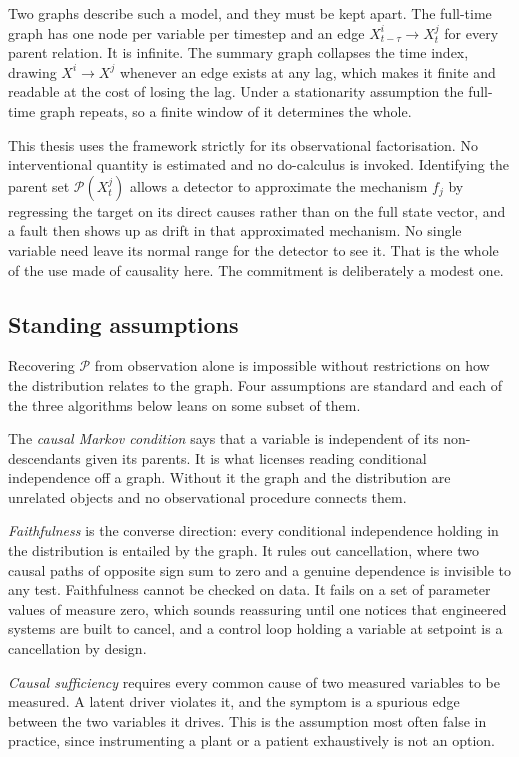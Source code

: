 Two graphs describe such a model, and they must be kept apart. The full-time graph has one node per variable per timestep and an edge $X^i_{t-\tau} \to X^j_t$ for every parent relation. It is infinite. The summary graph collapses the time index, drawing $X^i \to X^j$ whenever an edge exists at any lag, which makes it finite and readable at the cost of losing the lag. Under a stationarity assumption the full-time graph repeats, so a finite window of it determines the whole.

This thesis uses the framework strictly for its observational factorisation. No interventional quantity is estimated and no do-calculus is invoked. Identifying the parent set $\mathcal{P}(X_t^j)$ allows a detector to approximate the mechanism $f_j$ by regressing the target on its direct causes rather than on the full state vector, and a fault then shows up as drift in that approximated mechanism. No single variable need leave its normal range for the detector to see it. That is the whole of the use made of causality here. The commitment is deliberately a modest one.

\subsection{Standing assumptions}
\label{sec:bg-assumptions}

Recovering $\mathcal{P}$ from observation alone is impossible without restrictions on how the distribution relates to the graph. Four assumptions are standard and each of the three algorithms below leans on some subset of them.

The \emph{causal Markov condition} says that a variable is independent of its non-descendants given its parents. It is what licenses reading conditional independence off a graph. Without it the graph and the distribution are unrelated objects and no observational procedure connects them.

\emph{Faithfulness} is the converse direction: every conditional independence holding in the distribution is entailed by the graph. It rules out cancellation, where two causal paths of opposite sign sum to zero and a genuine dependence is invisible to any test. Faithfulness cannot be checked on data. It fails on a set of parameter values of measure zero, which sounds reassuring until one notices that engineered systems are built to cancel, and a control loop holding a variable at setpoint is a cancellation by design.

\emph{Causal sufficiency} requires every common cause of two measured variables to be measured. A latent driver violates it, and the symptom is a spurious edge between the two variables it drives. This is the assumption most often false in practice, since instrumenting a plant or a patient exhaustively is not an option.

